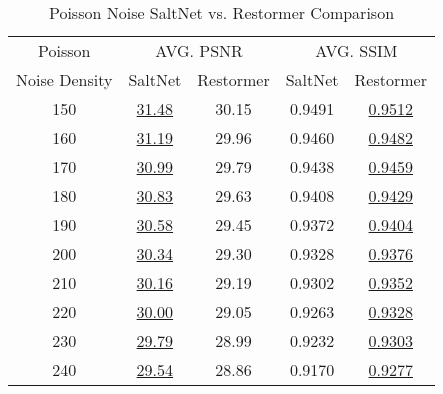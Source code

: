 \begin{table}[!hbt]
    \centering
    \begin{tabular}{ccccc}
        \hline
        Poisson & \multicolumn{2}{c}{AVG. PSNR} & \multicolumn{2}{c}{AVG. SSIM} \\
        Noise Density & SaltNet & Restormer & SaltNet & Restormer \\
        \hline
        150 & \underline{31.48} & 30.15 & 0.9491 & \underline{0.9512} \\
        160 & \underline{31.19} & 29.96 & 0.9460 & \underline{0.9482} \\
        170 & \underline{30.99} & 29.79 & 0.9438 & \underline{0.9459} \\
        180 & \underline{30.83} & 29.63 & 0.9408 & \underline{0.9429} \\
        190 & \underline{30.58} & 29.45 & 0.9372 & \underline{0.9404} \\
        200 & \underline{30.34} & 29.30 & 0.9328 & \underline{0.9376} \\
        210 & \underline{30.16} & 29.19 & 0.9302 & \underline{0.9352} \\
        220 & \underline{30.00} & 29.05 & 0.9263 & \underline{0.9328} \\
        230 & \underline{29.79} & 28.99 & 0.9232 & \underline{0.9303} \\
        240 & \underline{29.54} & 28.86 & 0.9170 & \underline{0.9277} \\
        \hline
    \end{tabular}
    \caption{Poisson Noise SaltNet vs. Restormer Comparison}
\end{table}